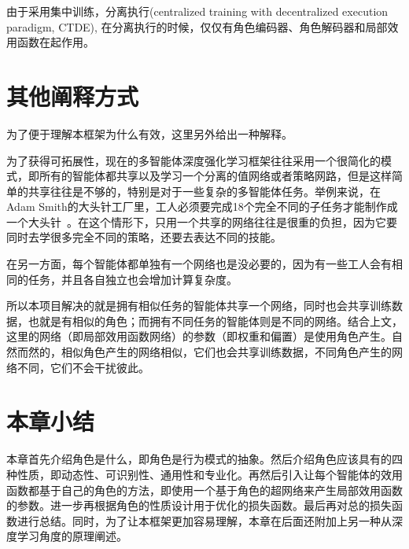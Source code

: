 由于采用集中训练，分离执行(centralized training with decentralized execution paradigm, CTDE), 在分离执行的时候，仅仅有角色编码器、角色解码器和局部效用函数在起作用。

\section{其他阐释方式}
为了便于理解本框架为什么有效，这里另外给出一种解释。

为了获得可拓展性，现在的多智能体深度强化学习框架往往采用一个很简化的模式，即所有的智能体都共享以及学习一个分离的值网络或者策略网路，但是这样简单的共享往往是不够的，特别是对于一些复杂的多智能体任务。举例来说，在Adam Smith的大头针工厂里，工人必须要完成18个完全不同的子任务才能制作成一个大头针~\cite{smith1937wealth}。在这个情形下，只用一个共享的网络往往是很重的负担，因为它要同时去学很多完全不同的策略，还要去表达不同的技能。

在另一方面，每个智能体都单独有一个网络也是没必要的，因为有一些工人会有相同的任务，并且各自独立也会增加计算复杂度。

所以本项目解决的就是拥有相似任务的智能体共享一个网络，同时也会共享训练数据，也就是有相似的角色；而拥有不同任务的智能体则是不同的网络。结合上文，这里的网络（即局部效用函数网络）的参数（即权重和偏置）是使用角色产生。自然而然的，相似角色产生的网络相似，它们也会共享训练数据，不同角色产生的网络不同，它们不会干扰彼此。

\section{本章小结}

本章首先介绍角色是什么，即角色是行为模式的抽象。然后介绍角色应该具有的四种性质，即动态性、可识别性、通用性和专业化。再然后引入让每个智能体的效用函数都基于自己的角色的方法，即使用一个基于角色的超网络来产生局部效用函数的参数。进一步再根据角色的性质设计用于优化的损失函数。最后再对总的损失函数进行总结。同时，为了让本框架更加容易理解，本章在后面还附加上另一种从深度学习角度的原理阐述。